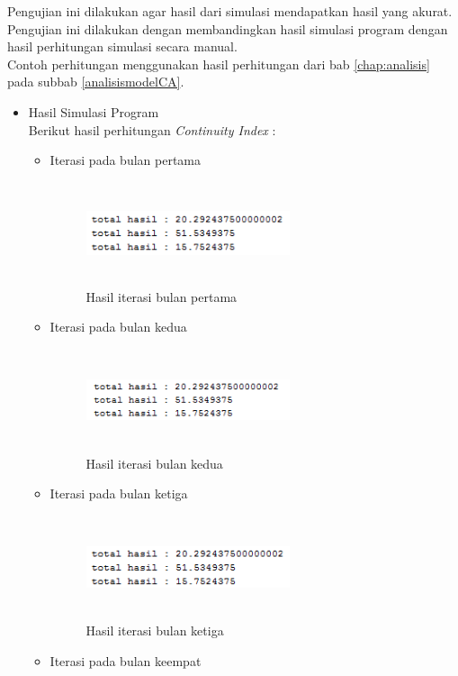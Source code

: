 Pengujian ini dilakukan agar hasil dari simulasi mendapatkan hasil yang akurat. Pengujian ini dilakukan dengan membandingkan hasil simulasi program dengan hasil perhitungan simulasi secara manual.\\
Contoh perhitungan menggunakan hasil perhitungan dari bab \ref{chap:analisis} pada subbab \ref{analisismodelCA}.
\begin{itemize}
\item Hasil Simulasi Program\\
	Berikut hasil perhitungan \textit{Continuity Index} :
	\begin{itemize}
		\item Iterasi pada bulan pertama
		
	\begin{figure} [H]
	\centering  
	\includegraphics[width=6cm, height=3cm]{hasilIterasi0} 
		\caption[Hasil Iterasi bulan pertama]{Hasil iterasi bulan pertama}
	\label{hasilIterasi0} 
\end{figure}
		\item Iterasi pada bulan kedua
		
	\begin{figure} [H]
	\centering  
	\includegraphics[width=6cm, height=3cm]{hasilIterasi1} 
		\caption[Hasil Iterasi bulan kedua]{Hasil iterasi bulan kedua}
	\label{hasilIterasi1} 
\end{figure}
		\item Iterasi pada bulan ketiga
		
	\begin{figure} [H]
	\centering  
	\includegraphics[width=6cm, height=3cm]{hasilIterasi2} 
		\caption[Hasil Iterasi bulan ketiga]{Hasil iterasi bulan ketiga}
	\label{hasilIterasi2} 
\end{figure}
		\item Iterasi pada bulan keempat
		

\end{itemize}
\end{itemize}
